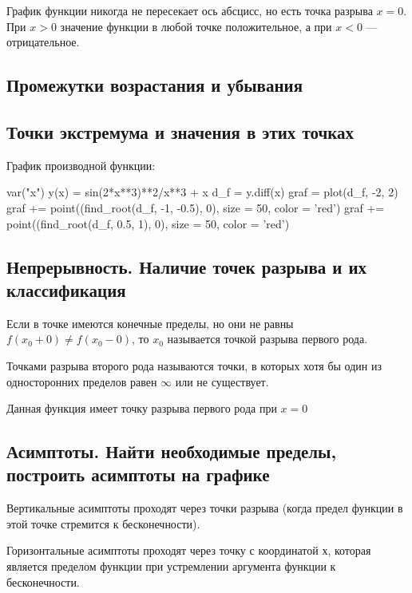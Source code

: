 График функции никогда не пересекает ось абсцисс, но есть точка разрыва $x = 0$. При $x > 0$ значение функции в любой точке положительное, а при $x < 0$ --- отрицательное.

\subsection{Промежутки возрастания и убывания}



\subsection{Точки экстремума и значения в этих точках}

График производной функции:

\begin{sagesilent}
	var("x")
	y(x) = sin(2*x**3)**2/x**3 + x
	d_f = y.diff(x)
	graf = plot(d_f, -2, 2)
	graf += point((find_root(d_f, -1, -0.5), 0), size = 50, color = 'red')
	graf += point((find_root(d_f, 0.5, 1), 0), size = 50, color = 'red')
\end{sagesilent}


\subsection{Непрерывность. Наличие точек разрыва и их классификация}

Если в точке имеются конечные пределы, но они не равны $f(x_0+0) \neq f(x_0-0)$, то $x_0$ называется точкой разрыва первого рода.

Точками разрыва второго рода называются точки, в которых хотя бы один из односторонних пределов равен $\infty$ или не существует.

Данная функция имеет точку разрыва первого рода при $x=0$

\subsection{Асимптоты. Найти необходимые пределы, построить асимптоты на графике}

Вертикальные асимптоты проходят через точки разрыва (когда предел функции в этой точке стремится к бесконечности). 

Горизонтальные асимптоты проходят через точку с координатой $х$, которая является пределом функции при устремлении аргумента функции к бесконечности.


